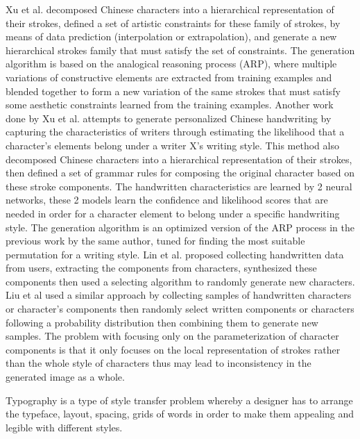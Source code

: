 \documentclass[12pt]{report}
\begin{document}
Xu et al.\cite{automatic-calligraphy} decomposed Chinese characters into a hierarchical representation of their
strokes, defined a set of artistic constraints for these family of strokes, by means of data prediction (interpolation or extrapolation), and generate a new hierarchical strokes family that must satisfy the set of constraints. The generation algorithm is based on the analogical reasoning process (ARP), where multiple variations of constructive elements are extracted from training examples and blended together to form a new variation of the same strokes that must satisfy some aesthetic constraints learned from the training examples.
Another work done by Xu et al.\cite{automatic-handwritten} attempts to generate personalized Chinese handwriting by capturing the characteristics of writers through estimating the likelihood that a character's elements belong under a writer X’s writing style. This
method also decomposed Chinese characters into a hierarchical representation of their strokes, then defined a set of grammar rules for composing the original character based on these stroke components. The handwritten characteristics are learned by 2
neural networks, these 2 models learn the confidence and likelihood scores that are needed in order for a character element to belong under a specific handwriting style. The generation algorithm is an optimized version of the ARP process in the previous
work by the same author, tuned for finding the most suitable permutation for a writing style. Lin et al.\cite{handwritten-font} proposed collecting handwritten data from users, extracting the
components from characters, synthesized these components then used a selecting algorithm to randomly generate new characters.
Liu et al\cite{automatic-personalized} used a similar approach by collecting samples of handwritten characters or character’s components then randomly select written components or characters
following a probability distribution then combining them to generate new samples. The problem with focusing only on the parameterization of character components is that it only focuses on the local representation of strokes rather than the whole
style of characters thus may lead to inconsistency in the generated image as a whole.

Typography is a type of style transfer problem whereby a designer has to arrange the typeface, layout, spacing, grids of words in order to make them appealing and legible with different styles. 
\end{document}
